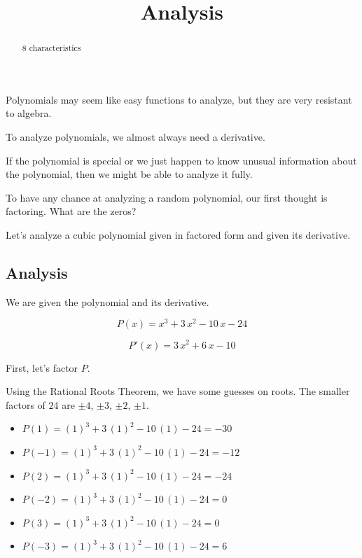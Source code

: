 \documentclass{ximera}
\title{Analysis}
\begin{document}
\begin{abstract}
8 characteristics
\end{abstract}
\maketitle





Polynomials may seem like easy functions to analyze, but they are very resistant to algebra.


To analyze polynomials, we almost always need a derivative.  



If the polynomial is special or we just happen to know unusual information about the polynomial, then we might be able to analyze it fully. 



To have any chance at analyzing a random polynomial, our first thought is factoring. What are the zeros? 


Let's analyze a cubic polynomial given in factored form and given its derivative. 


\subsection*{Analysis}


We are given the polynomial and its derivative. 


\[
P(x) = x^3 + 3 \, x^2 - 10 \, x - 24
\]


\[
P'(x) = 3 \, x^2 + 6 \, x - 10
\]



First, let's factor $P$. 

Using the Rational Roots Theorem, we have some guesses on roots.  The smaller factors of $24$ are $\pm4$, $\pm3$, $\pm2$, $\pm1$.  



\begin{itemize}
	\item $P(1) = (1)^3 + 3 \, (1)^2 - 10 \, (1) - 24 = -30$
	\item $P(-1) = (1)^3 + 3 \, (1)^2 - 10 \, (1) - 24 = -12$
	\item $P(2) = (1)^3 + 3 \, (1)^2 - 10 \, (1) - 24 = -24$
	\item $P(-2) = (1)^3 + 3 \, (1)^2 - 10 \, (1) - 24 = 0$
	\item $P(3) = (1)^3 + 3 \, (1)^2 - 10 \, (1) - 24 = 0$
	\item $P(-3) = (1)^3 + 3 \, (1)^2 - 10 \, (1) - 24 = 6$
\end{itemize}
\end{document}

